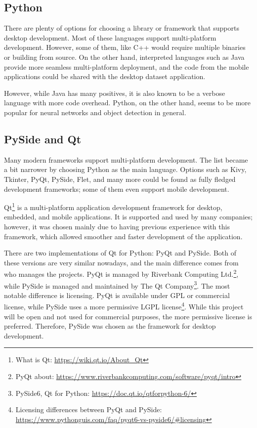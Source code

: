 \subsection{Python}
There are plenty of options for choosing a library or framework that supports desktop development. Most of these languages support multi-platform development. However, some of them, like C++ would require multiple binaries or building from source. On the other hand, interpreted languages such as Java provide more seamless multi-platform deployment, and the code from the mobile applications could be shared with the desktop dataset application. 

However, while Java has many positives, it is also known to be a verbose language with more code overhead. Python, on the other hand, seems to be more popular for neural networks and object detection in general. 

\subsection{PySide and Qt}
Many modern frameworks support multi-platform development. The list became a bit narrower by choosing Python as the main language. Options such as Kivy, Tkinter, PyQt, PySide, Flet, and many more could be found as fully fledged development frameworks; some of them even support mobile development. 

Qt\footnote{What is Qt: \url{https://wiki.qt.io/About_Qt}} is a multi-platform application development framework for desktop, embedded, and mobile applications. It is supported and used by many companies; however, it was chosen mainly due to having previous experience with this framework, which allowed smoother and faster development of the application.

There are two implementations of Qt for Python: PyQt and PySide. Both of these versions are very similar nowadays, and the main difference comes from who manages the projects. PyQt is managed by Riverbank Computing Ltd.\footnote{PyQt about: \url{https://www.riverbankcomputing.com/software/pyqt/intro}}, while PySide is managed and maintained by The Qt Company\footnote{PySide6, Qt for Python: \url{https://doc.qt.io/qtforpython-6/}}. The most notable difference is licensing. PyQt is available under GPL or commercial license, while PySide uses a more permissive LGPL license\footnote{Licensing differences between PyQt and PySide: \url{https://www.pythonguis.com/faq/pyqt6-vs-pyside6/\#licensing}}. While this project will be open and not used for commercial purposes, the more permissive license is preferred. Therefore, PySide was chosen as the framework for desktop development.

